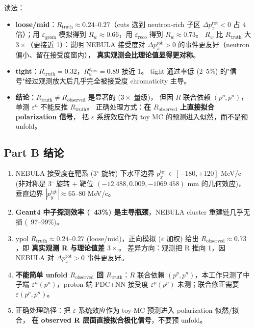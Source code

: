 \documentclass[a4paper,11pt]{ctexart}
\begin{document}
读法：
\begin{itemize}
    \item \textbf{loose/mid}：$R_\mathrm{truth} \approx 0.24$--$0.27$（cuts 选到 neutron-rich 子区
          $\Delta p_x^\mathrm{rot} < 0$ 占 4 倍）；用 $\varepsilon_\mathrm{geom}$ 模拟得到
          $R_w \approx 0.66$，用 $\varepsilon_\mathrm{reco}$ 得到 $R_w \approx 0.73$。
          $R_w$ 比 $R_\mathrm{truth}$ 大 $3 \times$（更接近 1）：说明 NEBULA 接受度对
          $\Delta p_x^\mathrm{rot} > 0$ 的事件更友好（neutron 偏小、留在接受度窗内），
          \textbf{真实观测会比理论值显得更对称}。
    \item \textbf{tight}：$R_\mathrm{truth} = 0.32$，$R_w^{\varepsilon_\mathrm{reco}} = 0.89$ 接近 1。
          tight 通过率低 (2--5\%) 的"信号"经过观测放大后几乎完全被接受度 chromaticity 主导。
    \item \textbf{结论}：$R_\mathrm{truth} \ne R_\mathrm{observed}$ 是显著的 ($3\times$ 量级)，
          但因 $R$ 联合依赖 $(p^p, p^n)$，单测 $\varepsilon^n$ 不能反推 $R_\mathrm{truth}$。
          正确处理方式：\textbf{在 $R_\mathrm{observed}$ 上直接拟合 polarization 信号}，
          把 $\varepsilon$ 系统效应作为 toy MC 的预测进入似然，而不是预 unfold。
\end{itemize}

\subsection{Part B 结论}

\begin{enumerate}
    \item NEBULA 接受度在靶系 (3$^\circ$ 旋转) 下水平边界 $p_x^\mathrm{tgt} \in [-180, +120]$ MeV/c
          (非对称是 3$^\circ$ 旋转 + 靶位 $(-12.488, 0.009, -1069.458)$ mm 的几何效应)，
          垂直边界 $|p_y^\mathrm{tgt}| \approx 65$--$80$ MeV/c。
    \item \textbf{Geant4 中子探测效率 (~43\%) 是主导瓶颈}，NEBULA cluster 重建链几乎无损 (~97--99\%)。
    \item ypol $R_\mathrm{truth} \approx 0.24$--$0.27$ (loose/mid)，正向模拟 ($\varepsilon$ 加权) 给出
          $R_\mathrm{observed} \approx 0.73$，即 \textbf{真实观测 R 与理论值差 $3 \times$}。
          差异方向：观测把 R 推向 1，因 NEBULA 对 $\Delta p_x^\mathrm{rot} > 0$ 事件更友好。
    \item \textbf{不能简单 unfold $R_\mathrm{observed}$ 回 $R_\mathrm{truth}$}：$R$ 联合依赖
          $(p^p, p^n)$，本工作只测了中子端 $\varepsilon^n(p^n)$，proton 端 PDC+NN 接受度
          $\varepsilon^p(p^p)$ 未测；联合修正需要 $\varepsilon(p^p, p^n)$。
    \item 正确处理路径：把 $\varepsilon$ 系统效应作为 toy-MC 预测进入 polarization 似然/拟合，
          \textbf{在 observed R 层面直接拟合极化信号}，不要预 unfold。
\end{enumerate}
\end{document}
